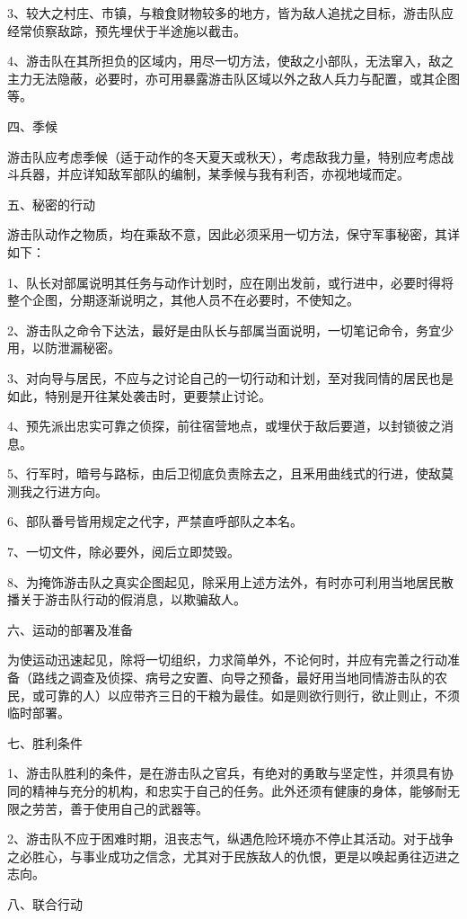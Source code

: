 3、较大之村庄、市镇，与粮食财物较多的地方，皆为敌人追扰之目标，游击队应经常侦察敌踪，预先埋伏于半途施以截击。

4、游击队在其所担负的区域内，用尽一切方法，使敌之小部队，无法窜入，敌之主力无法隐蔽，必要时，亦可用暴露游击队区域以外之敌人兵力与配置，或其企图等。

四、季候

游击队应考虑季候（适于动作的冬天夏天或秋天），考虑敌我力量，特别应考虑战斗兵器，并应详知敌军部队的编制，某季候与我有利否，亦视地域而定。

五、秘密的行动

游击队动作之物质，均在乘敌不意，因此必须采用一切方法，保守军事秘密，其详如下：

1、队长对部属说明其任务与动作计划时，应在刚出发前，或行进中，必要时得将整个企图，分期逐渐说明之，其他人员不在必要时，不使知之。

2、游击队之命令下达法，最好是由队长与部属当面说明，一切笔记命令，务宜少用，以防泄漏秘密。

3、对向导与居民，不应与之讨论自己的一切行动和计划，至对我同情的居民也是如此，特别是开往某处袭击时，更要禁止讨论。

4、预先派出忠实可靠之侦探，前往宿营地点，或埋伏于敌后要道，以封锁彼之消息。

5、行军时，暗号与路标，由后卫彻底负责除去之，且釆用曲线式的行进，使敌莫测我之行进方向。

6、部队番号皆用规定之代字，严禁直呼部队之本名。

7、一切文件，除必要外，阅后立即焚毁。

8、为掩饰游击队之真实企图起见，除采用上述方法外，有时亦可利用当地居民散播关于游击队行动的假消息，以欺骗敌人。

六、运动的部署及准备

为使运动迅速起见，除将一切组织，力求简单外，不论何时，并应有完善之行动准备（路线之调查及侦探、病号之安置、向导之预备，最好用当地同情游击队的农民，或可靠的人）以应带齐三日的干粮为最佳。如是则欲行则行，欲止则止，不须临时部署。

七、胜利条件

1、游击队胜利的条件，是在游击队之官兵，有绝对的勇敢与坚定性，并须具有协同的精神与充分的机构，和忠实于自己的任务。此外还须有健康的身体，能够耐无限之劳苦，善于使用自己的武器等。

2、游击队不应于困难时期，沮丧志气，纵遇危险环境亦不停止其活动。对于战争之必胜心，与事业成功之信念，尤其对于民族敌人的仇恨，更是以唤起勇往迈进之志向。


八、联合行动

